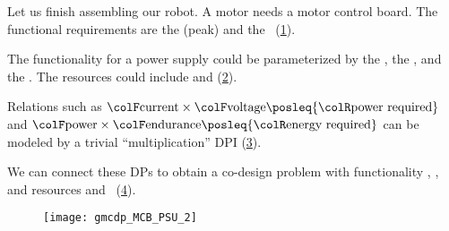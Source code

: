 \begin{example}

    \label{exa:finish}Let us finish assembling our robot. A motor needs
    a motor control board. The functional requirements are the (peak)
     and the ~(\cref{fig:mcb}).

    \begin{figure}[h!]
        \centering
        \caption{}
        \label{fig:mcb}
    \end{figure}


    The functionality for a power supply could be parameterized
    by the , the , and the .
    The resources could include  and  (\cref{fig:example-ba}).

    \begin{figure}[h!]
        \centering
        \caption{\label{fig:example-ba}}
    \end{figure}



    Relations such as ${\colF\mbox{current}}\times{\colF\mbox{voltage}}\posleq{\colR\mbox{power required}}$
    and ${\colF\mbox{power}}\times{\colF\mbox{endurance}}\posleq{\colR\mbox{energy required}}$
    can be modeled by a trivial ``multiplication'' DPI (\cref{fig:current_times_voltage}).

    \begin{figure}[h!]
        \centering
        \caption{\label{fig:current_times_voltage}}
    \end{figure}


    We can connect these DPs to obtain a co-design problem with
    functionality , ,  and resources
     and ~(\cref{fig:connect}).

    \begin{figure}[h!]
        \centering
        \texttt{[image: gmcdp\_MCB\_PSU\_2]}
        \caption{\label{fig:connect}}
    \end{figure}


\end{example}
